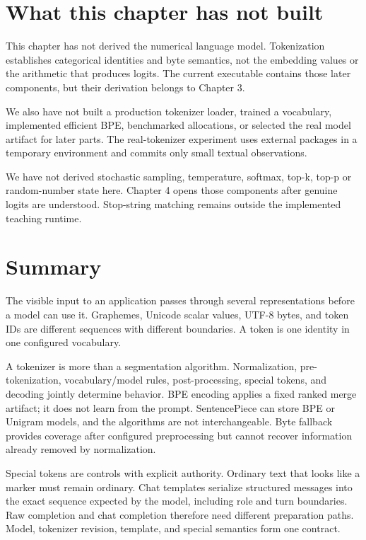 \section{What this chapter has not
built}\label{what-this-chapter-has-not-built}

This chapter has not derived the numerical language model. Tokenization
establishes categorical identities and byte semantics, not the embedding
values or the arithmetic that produces logits. The current executable
contains those later components, but their derivation belongs to Chapter 3.

We also have not built a production tokenizer loader, trained a
vocabulary, implemented efficient BPE, benchmarked allocations, or
selected the real model artifact for later parts. The real-tokenizer
experiment uses external packages in a temporary environment and commits
only small textual observations.

We have not derived stochastic sampling, temperature, softmax, top-k, top-p
or random-number state here. Chapter 4 opens those components after genuine
logits are understood. Stop-string matching remains outside the implemented
teaching runtime.

\section{Summary}\label{summary-1}

The visible input to an application passes through several
representations before a model can use it. Graphemes, Unicode scalar
values, UTF-8 bytes, and token IDs are different sequences with
different boundaries. A token is one identity in one configured
vocabulary.

A tokenizer is more than a segmentation algorithm. Normalization,
pre-tokenization, vocabulary/model rules, post-processing, special
tokens, and decoding jointly determine behavior. BPE encoding applies a
fixed ranked merge artifact; it does not learn from the prompt.
SentencePiece can store BPE or Unigram models, and the algorithms are
not interchangeable. Byte fallback provides coverage after configured
preprocessing but cannot recover information already removed by
normalization.

Special tokens are controls with explicit authority. Ordinary text that
looks like a marker must remain ordinary. Chat templates serialize
structured messages into the exact sequence expected by the model,
including role and turn boundaries. Raw completion and chat completion
therefore need different preparation paths. Model, tokenizer revision,
template, and special semantics form one contract.

